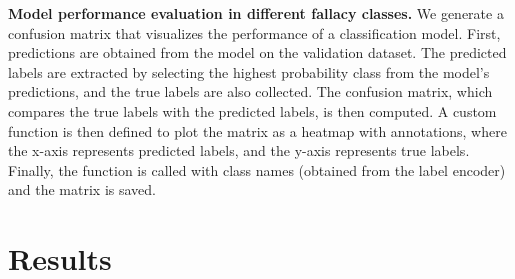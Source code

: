 \documentclass[runningheads]{llncs}
\begin{document}
\textbf{Model performance evaluation in different fallacy classes.}
We generate a confusion matrix that visualizes the performance of a classification model. First, predictions are obtained from the model on the validation dataset. The predicted labels are extracted by selecting the highest probability class from the model's predictions, and the true labels are also collected. The confusion matrix, which compares the true labels with the predicted labels, is then computed. A custom function is then defined to plot the matrix as a heatmap with annotations, where the x-axis represents predicted labels, and the y-axis represents true labels. Finally, the function is called with class names (obtained from the label encoder) and the matrix is saved.

\section{Results}
\end{document}
